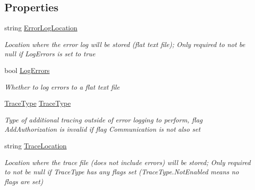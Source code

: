 \subsection*{Properties}
\begin{DoxyCompactItemize}
\item 
string \hyperlink{interface_cloud_api_public_1_1_interfaces_1_1_i_add_trace_settings_acdd869808512ad6cf46038e0479e7e94}{Error\-Log\-Location}
\begin{DoxyCompactList}\small\item\em Location where the error log will be stored (flat text file); Only required to not be null if Log\-Errors is set to true \end{DoxyCompactList}\item 
bool \hyperlink{interface_cloud_api_public_1_1_interfaces_1_1_i_add_trace_settings_a408aee5af8022c8d372501af301459a6}{Log\-Errors}
\begin{DoxyCompactList}\small\item\em Whether to log errors to a flat text file \end{DoxyCompactList}\item 
\hyperlink{namespace_cloud_api_public_1_1_static_a7e5ae8f2a85f427de3d6c8a5afcbb029}{Trace\-Type} \hyperlink{interface_cloud_api_public_1_1_interfaces_1_1_i_add_trace_settings_ac48528e64d5cf0ffce04bc93463d138e}{Trace\-Type}
\begin{DoxyCompactList}\small\item\em Type of additional tracing outside of error logging to perform, flag Add\-Authorization is invalid if flag Communication is not also set \end{DoxyCompactList}\item 
string \hyperlink{interface_cloud_api_public_1_1_interfaces_1_1_i_add_trace_settings_a5a3de8f9ca58461e90bdaa48538596e3}{Trace\-Location}
\begin{DoxyCompactList}\small\item\em Location where the trace file (does not include errors) will be stored; Only required to not be null if Trace\-Type has any flags set (Trace\-Type.\-Not\-Enabled means no flags are set) \end{DoxyCompactList}\item 

\end{DoxyCompactItemize}
